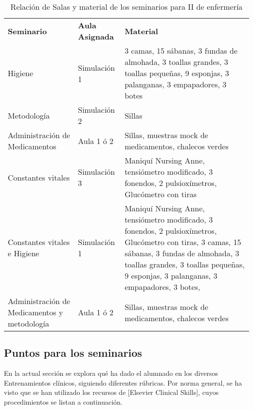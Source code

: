 \begin{table}[H]
\centering
\begin{tabular}{N{0.2\textwidth}N{0.12\textwidth}M{0.6\textwidth}}
{\color[HTML]{FFFFFF} \textbf{Seminario}} &
  {\color[HTML]{FFFFFF} \textbf{Aula Asignada}} &
  {\color[HTML]{FFFFFF} \textbf{Material}} \\
Higiene &
  Simulación 1 &
  3 camas, 15 sábanas, 3 fundas de almohada, 3 toallas grandes, 3 toallas pequeñas, 9 esponjas, 3 palanganas, 3 empapadores, 3 botes \\
Metodología &
  Simulación 2 &
  Sillas \\
Administración de Medicamentos &
  Aula 1 ó 2 &
  Sillas, muestras mock de medicamentos, chalecos verdes \\
Constantes vitales &
  Simulación 3 &
  Maniquí Nursing Anne, tensiómetro modificado, 3 fonendos, 2 pulsioxímetros, Glucómetro con tiras \\ \hline
Constantes vitales e Higiene &
  Simulación 1 &
  Maniquí Nursing Anne, tensiómetro modificado, 3 fonendos, 2 pulsioxímetros, Glucómetro con tiras, 3 camas, 15 sábanas, 3 fundas de almohada, 3 toallas grandes, 3 toallas pequeñas, 9 esponjas, 3 palanganas, 3 empapadores, 3 botes, \\
Administración de Medicamentos y metodología &
  Aula 1 ó 2 &
  Sillas, muestras mock de medicamentos, chalecos verdes\\
  \hline
\end{tabular}
\caption{Relación de Salas y material de los seminarios para II de enfermería}
\label{tab:PlanXVIII:SalasEstaciones}
\end{table}
\subsection{Puntos para los seminarios}
En la actual sección se explora qué ha dado el alumnado en los diversos Entrenamientos clínicos, siguiendo diferentes rúbricas. Por norma general, se ha visto que se han utilizado los recursos de \href{https://www.elsevierclinicalskills.es/default.aspx?language=es-ES}[Elsevier Clinical Skills], cuyos procedimientos se listan a continuación.
